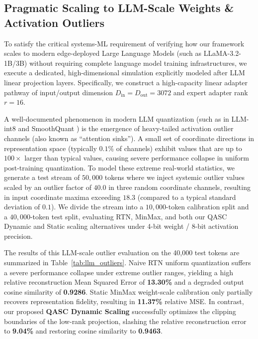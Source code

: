 \subsection{Pragmatic Scaling to LLM-Scale Weights \& Activation Outliers}
\label{sec:llm_outlier_scaling}
To satisfy the critical systems-ML requirement of verifying how our framework scales to modern edge-deployed Large Language Models (such as LLaMA-3.2-1B/3B) without requiring complete language model training infrastructures, we execute a dedicated, high-dimensional simulation explicitly modeled after LLM linear projection layers. Specifically, we construct a high-capacity linear adapter pathway of input/output dimension $D_{\text{in}} = D_{\text{out}} = 3072$ and expert adapter rank $r = 16$. 

A well-documented phenomenon in modern LLM quantization (such as in LLM-int8 \cite{dettmers2022llmint8} and SmoothQuant \cite{xiao2023smoothquant}) is the emergence of heavy-tailed activation outlier channels (also known as ``attention sinks''). A small set of coordinate directions in representation space (typically $0.1\%$ of channels) exhibit values that are up to $100\times$ larger than typical values, causing severe performance collapse in uniform post-training quantization. To model these extreme real-world statistics, we generate a test stream of $50,000$ tokens where we inject systemic outlier values scaled by an outlier factor of $40.0$ in three random coordinate channels, resulting in input coordinate maxima exceeding $18.3$ (compared to a typical standard deviation of $0.1$). We divide the stream into a $10,000$-token calibration split and a $40,000$-token test split, evaluating RTN, MinMax, and both our QASC Dynamic and Static scaling alternatives under 4-bit weight / 8-bit activation precision.

The results of this LLM-scale outlier evaluation on the 40,000 test tokens are summarized in Table~\ref{tab:llm_outliers}. Naive RTN uniform quantization suffers a severe performance collapse under extreme outlier ranges, yielding a high relative reconstruction Mean Squared Error of \textbf{13.30\%} and a degraded output cosine similarity of \textbf{0.9286}. Static MinMax weight-scale calibration only partially recovers representation fidelity, resulting in \textbf{11.37\%} relative MSE. In contrast, our proposed \textbf{QASC Dynamic Scaling} successfully optimizes the clipping boundaries of the low-rank projection, slashing the relative reconstruction error to \textbf{9.04\%} and restoring cosine similarity to \textbf{0.9463}. 


